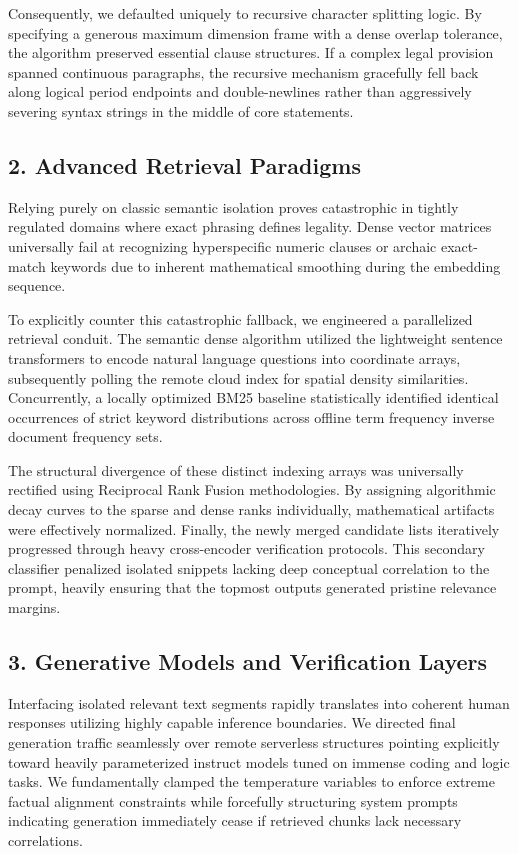 \documentclass[conference]{IEEEtran}
\begin{document}
Consequently, we defaulted uniquely to recursive character splitting logic. By specifying a generous maximum dimension frame with a dense overlap tolerance, the algorithm preserved essential clause structures. If a complex legal provision spanned continuous paragraphs, the recursive mechanism gracefully fell back along logical period endpoints and double-newlines rather than aggressively severing syntax strings in the middle of core statements.

\subsection{2. Advanced Retrieval Paradigms}
Relying purely on classic semantic isolation proves catastrophic in tightly regulated domains where exact phrasing defines legality. Dense vector matrices universally fail at recognizing hyperspecific numeric clauses or archaic exact-match keywords due to inherent mathematical smoothing during the embedding sequence.

To explicitly counter this catastrophic fallback, we engineered a parallelized retrieval conduit. The semantic dense algorithm utilized the lightweight sentence transformers to encode natural language questions into coordinate arrays, subsequently polling the remote cloud index for spatial density similarities. Concurrently, a locally optimized BM25 baseline statistically identified identical occurrences of strict keyword distributions across offline term frequency inverse document frequency sets. 

The structural divergence of these distinct indexing arrays was universally rectified using Reciprocal Rank Fusion methodologies. By assigning algorithmic decay curves to the sparse and dense ranks individually, mathematical artifacts were effectively normalized. Finally, the newly merged candidate lists iteratively progressed through heavy cross-encoder verification protocols. This secondary classifier penalized isolated snippets lacking deep conceptual correlation to the prompt, heavily ensuring that the topmost outputs generated pristine relevance margins.

\subsection{3. Generative Models and Verification Layers}
Interfacing isolated relevant text segments rapidly translates into coherent human responses utilizing highly capable inference boundaries. We directed final generation traffic seamlessly over remote serverless structures pointing explicitly toward heavily parameterized instruct models tuned on immense coding and logic tasks. We fundamentally clamped the temperature variables to enforce extreme factual alignment constraints while forcefully structuring system prompts indicating generation immediately cease if retrieved chunks lack necessary correlations. 
\end{document}
